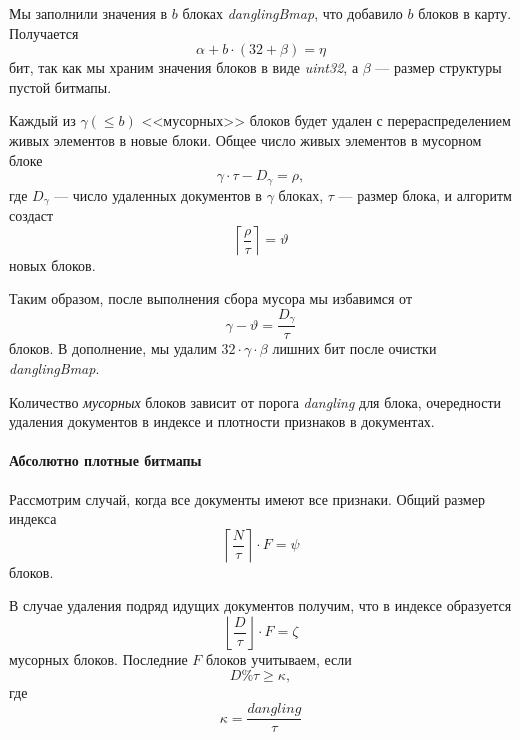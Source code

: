 Мы заполнили значения в $b$ блоках \textit{danglingBmap}, что добавило $b$ блоков в карту.
Получается 
\begin{equation}
    \label{eta}
    \alpha + b \cdot (32 + \beta)= \eta
\end{equation}
бит, так как мы храним значения блоков в виде \textit{uint32}, а $\beta$ — размер
структуры пустой битмапы.

Каждый из $\gamma (\leq b)$ <<мусорных>> блоков будет удален с перераспределением живых
элементов в новые блоки. Общее число живых элементов в мусорном блоке 
\begin{equation}
    \gamma \cdot \tau - D_{\gamma} = \rho,
\end{equation}
где $D_{\gamma}$ — число удаленных документов в $\gamma$ блоках, $\tau$ — размер блока, и алгоритм создаст
\begin{equation}
    \left\lceil \frac{\rho}{\tau}\right\rceil = \vartheta 
\end{equation}
новых блоков.

Таким образом, после выполнения сбора мусора мы избавимся от 
\begin{equation}
    \gamma - \vartheta = \frac{D_{\gamma}}{\tau}
\end{equation}
блоков.
В дополнение, мы удалим $32 \cdot \gamma \cdot \beta$ лишних бит после очистки \textit{danglingBmap}.

Количество \textit{мусорных} блоков зависит от порога \textit{dangling} для
блока, очередности удаления документов в индексе и плотности признаков в
документах.

\paragraph{Абсолютно плотные битмапы}

Рассмотрим случай, когда все документы имеют все признаки. Общий размер
индекса
\begin{equation}
    \left\lceil\frac{N}{\tau}\right\rceil \cdot F = \psi
\end{equation}
блоков.

В случае удаления подряд идущих документов получим, что в индексе
образуется
\begin{equation}
    \left\lfloor\frac{D}{\tau}\right\rfloor \cdot F = \zeta
\end{equation}
мусорных блоков. Последние $F$ блоков учитываем, если 
\begin{equation}
    D \% \tau \geq \kappa,
\end{equation}
где
\begin{equation}
    \kappa = \frac{dangling}{\tau}
\end{equation}

